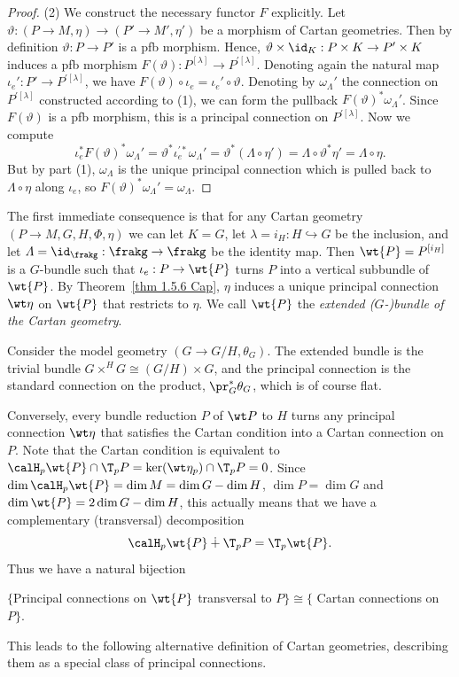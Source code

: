 \begin{proof}
    (2) We construct the necessary functor $F$ explicitly. Let $\vartheta:(P\to M,\eta)\to (P'\to M',\eta')$ be a morphism of Cartan geometries. Then by definition $\vartheta:P\to P'$ is a \gls{pfb} morphism. Hence, $\vartheta\times\id_K:P\times K\to P'\times K$ induces a \gls{pfb} morphism $F(\vartheta):P^{[\lambda]}\to P^{\prime[\lambda]}$. Denoting again the natural map $\iota_e':P'\to P^{\prime[\lambda]}$, we have $F(\vartheta)\circ\iota_e=\iota_e'\circ \vartheta$. Denoting by $\omega_\varLambda'$ the connection on $P^{\prime[\lambda]}$ constructed according to (1), we can form the pullback $F(\vartheta)^\ast \omega_\varLambda'$. Since $F(\vartheta)$ is a \gls{pfb} morphism, this is a principal connection on $P^{\prime[\lambda]}$. Now we compute 
    \[\iota_e^\ast F(\vartheta)^\ast\omega_\varLambda'=\vartheta^\ast\iota_e^{\prime\ast}\omega_\varLambda'=\vartheta^\ast(\varLambda\circ\eta')=\varLambda\circ\vartheta^\ast\eta'=\varLambda\circ\eta.\]
    But by part (1), $\omega_\varLambda$ is the unique principal connection which is pulled back to $\varLambda\circ\eta$ along $\iota_e$, so $F(\vartheta)^\ast \omega_\varLambda'=\omega_\varLambda$.
\end{proof}


The first immediate consequence is that for any Cartan geometry $(P\to M,G,H,\Phi,\eta)$ we can let $K=G$, let $\lambda=i_H:H\hookrightarrow G$ be the inclusion, and let $\varLambda=\id_\frakg:\frakg\to\frakg$ be the identity map. Then $\wt{P}=P^{[i_H]}$ is a $G$-bundle such that $\iota_e:P\to \wt{P}$ turns $P$ into a vertical subbundle of $\wt{P}$. By Theorem~\ref{thm 1.5.6 Cap}, $\eta$ induces a unique principal connection $\wt\eta$ on $\wt{P}$ that restricts to $\eta$. We call $\wt{P}$ the \emph{extended ($G$-)bundle of the Cartan geometry}.

\begin{example}
    Consider the model geometry $(G\to G\slash H,\theta_G)$. The extended bundle is the trivial bundle $G\times^H G\cong (G\slash H)\times G$, and the principal connection is the standard connection on the product, $\pr_G^\ast\theta_G$, which is of course flat.
\end{example}

Conversely, every bundle reduction $P$ of $\wt P$ to $H$ turns any principal connection $\wt\eta$ that satisfies the Cartan condition into a Cartan connection on $P$. Note that the Cartan condition is equivalent to $\calH_p \wt{P}\cap \T_p P=\ker(\wt\eta_p)\cap \T_pP=0$. Since $\dim \calH_p \wt{P}=\dim M=\dim G-\dim H$, $\dim P=\dim G$ and $\dim \wt{P}=2\dim G-\dim H$, this actually means that we have a complementary (transversal) decomposition 
\[\calH_p \wt{P}\dotplus \T_p P=\T_p\wt{P}.\] Thus we have a natural bijection 
\begin{center}
    $\{$Principal connections on $\wt{P}$  transversal to $P\}\cong \{$ Cartan connections on $P\}$.
\end{center}
This leads to the following alternative definition of Cartan geometries, describing them as a special class of principal connections.

